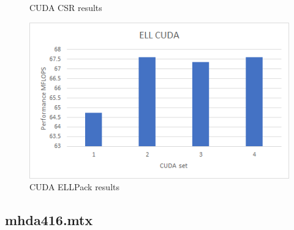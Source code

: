 \documentclass{scrreprt}
\begin{document}
\begin{figure}[ht]
\begin{minipage}[b]{0.5\linewidth}
    \caption{CUDA CSR results} 
    \vspace{4ex}
  \end{minipage}%
  \begin{minipage}[b]{0.5\linewidth}
    \centering
    \includegraphics[width=.9\linewidth]{olm100ELLCUDA.png} 
    \caption{CUDA ELLPack  results} 
    \vspace{4ex}
  \end{minipage} 
\end{figure}
\FloatBarrier




\subsection{mhda416.mtx}
\end{document}
